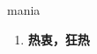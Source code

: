 
\begin{frame}
{\huge mania}
\begin{center}
\begin{enumerate}\Large
  \item \textbf{热衷，狂热}
\end{enumerate}
\end{center}
\end{frame}
